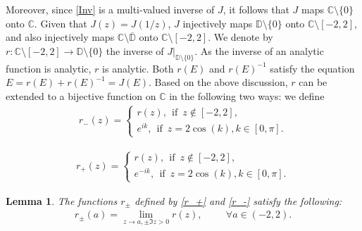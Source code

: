 \documentclass[12pt,oneside,onecolumn,open]{article}
\newtheorem{lema}[teo]{Lemma}
\begin{document}
Moreover, since \eqref{Inv} is a multi-valued inverse of \( J \), it follows that \( J \) maps \( \mathbb{C} \setminus \{0\} \) onto \( \mathbb{C} \). Given that \( J(z) = J(1/z) \), \( J \) injectively maps \( \mathbb{D}\setminus \{0\} \) onto \( \mathbb{C} \setminus [-2, 2] \), and also injectively maps \( \mathbb{C} \setminus \overline{\mathbb{D}} \) onto \( \mathbb{C} \setminus [-2, 2] \). We denote by  
$ 
r : \mathbb{C} \setminus [-2,2] \to \mathbb{D}\setminus \{0\}
$ 
the inverse of \( J|_{\mathbb{D} \setminus \{0\}} \). As the inverse of an analytic function is analytic, \( r \) is analytic.   Both \( r(E) \) and \( r(E)^{-1} \) satisfy the equation  
$ 
E = r(E) + r(E)^{-1} = J(E).
$  
Based on the above discussion, \( r \) can be extended to a bijective function on \( \mathbb{C} \) in the following two ways: we define  
\begin{align} \label{r_-}
    r_-(z) = \begin{cases}
        r(z),   \: \: \text{if}\,\,\,  z \notin [-2,2] ,
        \\ e^{ik},   \: \: \text{if} \,\,\,  z = 2 \cos(k) , k \in [0,\pi].  
    \end{cases}
\end{align}

\begin{align} \label{r_+}
    r_+(z) = \begin{cases}
        r(z),   \: \: \text{if}\,\,\,  z \notin [-2,2] ,
        \\ e^{-ik},   \: \: \text{if}\,\,\, z   = 2 \cos(k) , k \in [0,\pi].  
    \end{cases}
\end{align}
\begin{lema} \label{rpm}
The functions $r_\pm $ defined by \eqref{r_+} and \eqref{r_-} satisfy the following: 
\begin{align}
    r_{\pm}(a) = \lim_{z \to a, \pm \Im z > 0 } r(z), \hspace{1cm} \forall a \in (-2,2).   
\end{align}




    
\end{lema}
\end{document}
